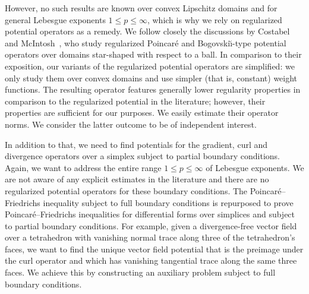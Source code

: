 \documentclass[10pt,letterpaper]{article}
\newcommand{\mwl}[1]{{\color{red}#1}}
\begin{document}
However, no such results are known over convex Lipschitz domains and for general Lebesgue exponents $1 \leq p \leq \infty$, which is why we rely on regularized potential operators as a remedy. %
We follow closely the discussions by Costabel and McIntosh~\cite{costabel2010bogovskiui},
who study regularized Poincar\'e and Bogovski\u{\i}-type potential operators over domains star-shaped with respect to a ball. 
In comparison to their exposition, our variants of the regularized potential operators are simplified:
we only study them over convex domains and use simpler (that is, constant) weight functions. 
The resulting operator features generally lower regularity properties in comparison to the regularized potential in the literature;
however, their properties are sufficient for our purposes. We easily estimate their operator norms. 
We consider the latter outcome to be of independent interest. 


In addition to that, we need to find potentials for the gradient, curl and divergence operators over a simplex subject to partial boundary conditions. 
Again, we want to address the entire range $1 \leq p \leq \infty$ of Lebesgue exponents. 
We are not aware of any explicit estimates in the literature and there are no regularized potential operators for these boundary conditions. 
The Poincar\'e--Friedrichs inequality subject to full boundary conditions is repurposed to prove Poincar\'e--Friedrichs inequalities for differential forms over simplices and subject to partial boundary conditions. 
For example, given a divergence-free vector field over a tetrahedron with vanishing normal trace along three of the tetrahedron's faces, 
we want to find the unique vector field potential that is the preimage under the curl operator and which has vanishing tangential trace along the same three faces. 
We achieve this by constructing an auxiliary problem subject to full boundary conditions.
\\
\end{document}
